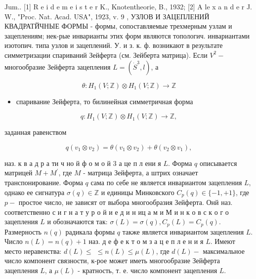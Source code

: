 \documentclass[10pt]{article}
\begin{document}
Jum.. [1] R e i d e m e i s t e r K., Knotentheorie, B., 1932; [2] A le x a n d e r J. W., "Proc. Nat. Acad. USA", 1923, v. 9 , УЗЛОВ И ЗАЦЕПЛЕНИЙ КВАДРАТЙЧНЫЕ ФОРМЫ - формы, сопоставляемые трехмерным узлам и зацеплениям; нек-рые инварианты этих форм являются топологич. инвариантами изотопич. типа узлов и зацеплений. У. и з. к. ф. возникают в результате симметризации спариваний Зейферта (см. Зейберта матрица). Если $V^{2}-$ многообразие Зейферта зацепления $L=\left(\dot{S}^{3}, l\right)$, а



\[

\theta: H_{1}(V ; \mathbb{Z}) \otimes H_{1}(V ; \mathbb{Z}) \longrightarrow \mathbb{Z}

\]



\begin{itemize}

  \item спаривание Зейферта, то билинейная симметричная форма

\end{itemize}



\[

q: H_{1}(V ; \mathbb{Z}) \otimes H_{1}(V ; \mathbb{Z}) \longrightarrow \mathbb{Z},

\]



заданная равенством



\[

q\left(v_{1} \otimes v_{2}\right)=\theta\left(v_{1} \otimes v_{2}\right)+\theta\left(v_{2} \otimes v_{1}\right),

\]



наз. к в а д р а ти ч но й ф о м о й 3 а це п л ени я $L$. Форма $q$ описывается матрицей $M+M^{\prime}$, где $M$ - матрица Зейферта, а штрих означает транспонирование. Форма $q$ сама по себе не является инвариантом зацепления $L$, однако ее сигнатура $\sigma(q) \in \mathbb{Z}$ и единицы Минковского $C_{p}(q) \in\{-1,+1\}$, где $p-$ простое число, не зависят от выбора многообразия Зейферта. Онй наз. соответственно с и г н а т у р о й и е д и н иц а м и М и н к о в с к о г о зацепления $L$ и обозначаются так: $\sigma(L)=\sigma(q), C_{p}(L)=C_{p}(q)$. Размерность $n(q)$ радикала формы $q$ также является инвариантом зацепления $L$. Число $n(L)=n(q)+1$ наз. д е ф е к т о м з а ц е п л е н и я $L$. Имеют место неравенства: $d(L) \leqslant$ $\leqslant n(L) \leqslant \mu(L)$, где $d(L)-$ максимальное число компонент связности, к-рое может иметь многообразие Зейферта зацепления $L$, а $\mu(L)$ - кратность, т. е. число компонент зацепления $L$.
\end{document}
